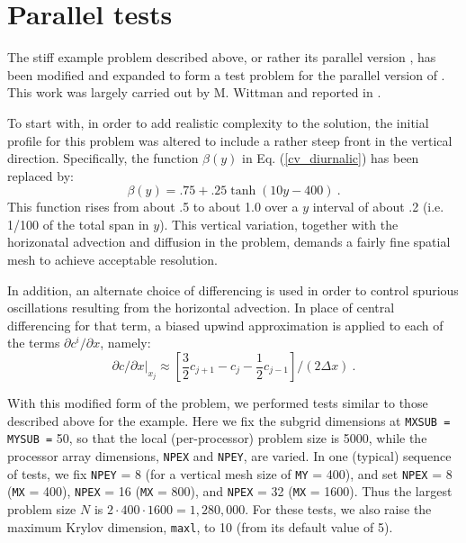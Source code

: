 \section{Parallel tests}\label{s:ex_tests}

The stiff example problem  described above, or rather its parallel
version , has been modified and expanded to form a test problem for
the parallel version of {\cvode}.  This work was largely carried out
by M. Wittman and reported in \cite{Wit:96}.

To start with, in order to add realistic complexity to the solution, the
initial profile for this problem was altered to include a rather steep front
in the vertical direction. Specifically, the function $\beta(y)$ in
Eq. (\ref{cv_diurnalic}) has been replaced by:
\begin{equation}
\beta(y) = .75 + .25 \tanh(10 y - 400) ~.
\end{equation}
This function rises from about .5 to about 1.0 over a $y$ interval of about
.2 (i.e. 1/100 of the total span in $y$). This vertical variation, together
with the horizonatal advection and diffusion in the problem, demands a
fairly fine spatial mesh to achieve acceptable resolution.

In addition, an alternate choice of differencing is used in order to control
spurious oscillations resulting from the horizontal advection. In place of
central differencing for that term, a biased upwind approximation is applied
to each of the terms $\partial c^i/\partial x$, namely: 
\begin{equation}
\left. \partial c/\partial x\right| _{x_j}\approx \left[ \frac
32c_{j+1}-c_j-\frac 12c_{j-1}\right] /(2\Delta x) ~.
\end{equation}

With this modified form of the problem, we performed tests similar to those
described above for the example. Here we fix the subgrid dimensions at
{\tt MXSUB = MYSUB =} 50, so that the local (per-processor) problem size is 5000,
while the processor array dimensions, {\tt NPEX} and {\tt NPEY}, are varied.
In one (typical) sequence of tests, we fix {\tt NPEY} = 8 (for a vertical
mesh size of {\tt MY} = 400), and set {\tt NPEX} = 8 ({\tt MX} = 400),
{\tt NPEX} = 16 ({\tt MX} = 800), and {\tt NPEX} = 32 ({\tt MX} = 1600). 
Thus the largest problem size $N$ is $2 \cdot 400 \cdot 1600 = 1,280,000$. 
For these tests, we also raise the maximum Krylov dimension, {\tt maxl},
to 10 (from its default value of 5).

